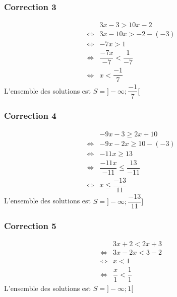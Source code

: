 \documentclass[15pt, mathserif]{beamer}
\begin{document}
\begin{frame}
\vspace{-10mm}
	\frametitle{Correction 3}
\begin{align*} 
 & 3x-3> 10x-2\\ 
 \Leftrightarrow & 3x-10x > -2-\left(-3\right)\\ 
 \Leftrightarrow & -7x > 1\\ 
 \Leftrightarrow &\dfrac{-7x}{-7}< \dfrac{1}{-7} \\ 
 \Leftrightarrow & x < \dfrac{-1}{7} 
 \end{align*} 
 L'ensemble des solutions est $S=]-\infty;\dfrac{-1}{7}[$\end{frame}


\begin{frame}
\vspace{-10mm}
	\frametitle{Correction 4}
\begin{align*} 
 & -9x-3\geqslant  2x+10\\ 
 \Leftrightarrow & -9x-2x \geqslant  10-\left(-3\right)\\ 
 \Leftrightarrow & -11x \geqslant  13\\ 
 \Leftrightarrow &\dfrac{-11x}{-11} \leqslant \dfrac{13}{-11} \\ 
 \Leftrightarrow & x \leqslant \dfrac{-13}{11} 
 \end{align*} 
 L'ensemble des solutions est $S=]-\infty;\dfrac{-13}{11}]$\end{frame}


\begin{frame}
\vspace{-10mm}
	\frametitle{Correction 5}
\begin{align*} 
 & 3x+2< 2x+3\\ 
 \Leftrightarrow & 3x-2x < 3-2\\ 
 \Leftrightarrow & x < 1\\ 
 \Leftrightarrow &\dfrac{x}{1}< \dfrac{1}{1} 
 \end{align*} 
 L'ensemble des solutions est $S=]-\infty;1[$\end{frame}
\end{document}
